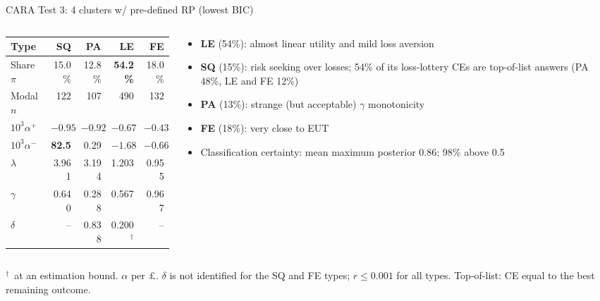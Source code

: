 \documentclass[aspectratio=169,11pt]{beamer}
\newcommand{\ap}{\alpha^{+}}
\newcommand{\am}{\alpha^{-}}
\newcommand{\bd}{\ensuremath{^{\dagger}}}
\newcommand{\tabnote}[1]{\par\vfill{\scriptsize\color{muted}#1\par}}
\newcommand{\tight}{\setlength{\itemsep}{3pt}}
\begin{document}
\begin{frame}{CARA Test 3: 4 clusters w/ pre-defined RP (lowest BIC)}
\begin{columns}[T,onlytextwidth]
\begin{column}{0.45\textwidth}
\centering\footnotesize\setlength{\tabcolsep}{4pt}
\begin{tabular}{l rrrr}
\toprule
Type & SQ & PA & LE & FE\\
\midrule
Share $\pi$ & 15.0\% & 12.8\% & \textbf{54.2\%} & 18.0\%\\
Modal $n$ & 122 & 107 & 490 & 132\\
\midrule
$10^{3}\ap$ & $-0.95$ & $-0.92$ & $-0.67$ & $-0.43$\\
$10^{3}\am$ & \textbf{82.5} & 0.29 & $-1.68$ & $-0.66$\\
$\lambda$ & 3.961 & 3.194 & 1.203 & 0.955\\
$\gamma$ & 0.640 & 0.288 & 0.567 & 0.967\\
$\delta$ & -- & 0.838 & 0.200\bd & --\\
\bottomrule
\end{tabular}
\end{column}
\begin{column}{0.51\textwidth}
\begin{itemize}\small\tight
  \item \textbf{LE} (54\%): almost linear utility and mild loss aversion
  \item \textbf{SQ} (15\%): risk seeking over losses; 54\% of its loss-lottery CEs are top-of-list answers (PA 48\%, LE and FE 12\%)
  \item \textbf{PA} (13\%): strange (but acceptable) $\gamma$ monotonicity
  \item \textbf{FE} (18\%): very close to EUT
  \item Classification certainty: mean maximum posterior 0.86; 98\% above 0.5
\end{itemize}
\end{column}
\end{columns}
\tabnote{\bd\ at an estimation bound. $\alpha$ per \pounds. $\delta$ is not identified for the SQ and FE types; $r\le 0.001$ for all types. Top-of-list: CE equal to the best remaining outcome.}
\end{frame}
\end{document}
